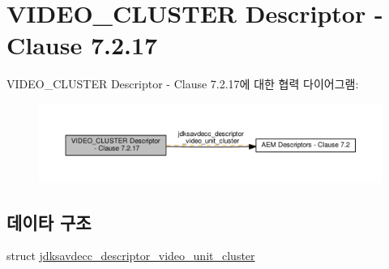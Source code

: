 \hypertarget{group__descriptor__video__cluster}{}\section{V\+I\+D\+E\+O\+\_\+\+C\+L\+U\+S\+T\+ER Descriptor -\/ Clause 7.2.17}
\label{group__descriptor__video__cluster}
V\+I\+D\+E\+O\+\_\+\+C\+L\+U\+S\+T\+ER Descriptor -\/ Clause 7.2.17에 대한 협력 다이어그램\+:
\nopagebreak
\begin{figure}[H]
\begin{center}
\leavevmode
\includegraphics[width=350pt]{group__descriptor__video__cluster}
\end{center}
\end{figure}
\subsection*{데이타 구조}
\begin{DoxyCompactItemize}
\item 
struct \hyperlink{structjdksavdecc__descriptor__video__unit__cluster}{jdksavdecc\+\_\+descriptor\+\_\+video\+\_\+unit\+\_\+cluster}
\end{DoxyCompactItemize}
